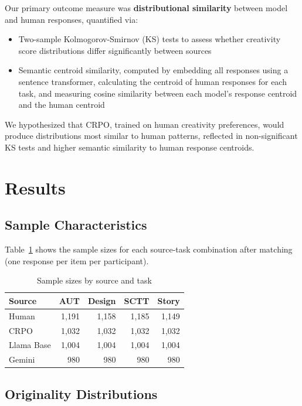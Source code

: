 \documentclass[11pt,twocolumn]{article}
\begin{document}
Our primary outcome measure was \textbf{distributional similarity} between model and human responses, quantified via:
\begin{itemize}
    \item Two-sample Kolmogorov-Smirnov (KS) tests to assess whether creativity score distributions differ significantly between sources
    \item Semantic centroid similarity, computed by embedding all responses using a sentence transformer, calculating the centroid of human responses for each task, and measuring cosine similarity between each model's response centroid and the human centroid
\end{itemize}

We hypothesized that CRPO, trained on human creativity preferences, would produce distributions most similar to human patterns, reflected in non-significant KS tests and higher semantic similarity to human response centroids.

\section{Results}

\subsection{Sample Characteristics}

Table~\ref{tab:samples} shows the sample sizes for each source-task combination after matching (one response per item per participant).

\begin{table}[h]
\centering
\caption{Sample sizes by source and task}
\label{tab:samples}
\begin{tabular}{lrrrr}
\toprule
Source & AUT & Design & SCTT & Story \\
\midrule
Human & 1,191 & 1,158 & 1,185 & 1,149 \\
CRPO & 1,032 & 1,032 & 1,032 & 1,032 \\
Llama Base & 1,004 & 1,004 & 1,004 & 1,004 \\
Gemini & 980 & 980 & 980 & 980 \\
\bottomrule
\end{tabular}
\end{table}

\subsection{Originality Distributions}
\end{document}
